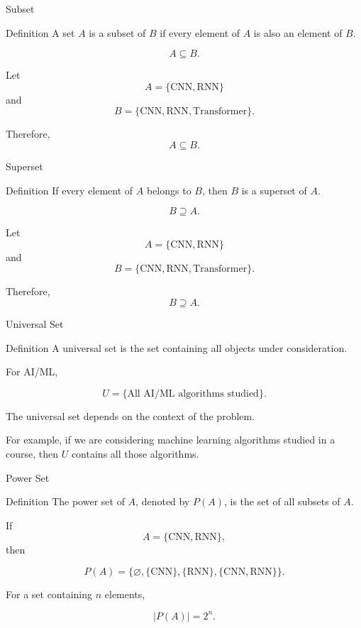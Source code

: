 \documentclass[aspectratio=169]{beamer}
\begin{document}
\begin{frame}{Subset}
\begin{block}{Definition}
A set $A$ is a subset of $B$ if every element of $A$ is also an element of $B$.
\end{block}

\[
A\subseteq B.
\]

Let
\[
A=\{\text{CNN},\text{RNN}\}
\]
and
\[
B=\{\text{CNN},\text{RNN},\text{Transformer}\}.
\]

Therefore,
\[
A\subseteq B.
\]
\end{frame}

\begin{frame}{Superset}
\begin{block}{Definition}
If every element of $A$ belongs to $B$, then $B$ is a superset of $A$.
\end{block}

\[
B\supseteq A.
\]

Let
\[
A=\{\text{CNN},\text{RNN}\}
\]
and
\[
B=\{\text{CNN},\text{RNN},\text{Transformer}\}.
\]

Therefore,
\[
B\supseteq A.
\]
\end{frame}

\begin{frame}{Universal Set}
\begin{block}{Definition}
A universal set is the set containing all objects under consideration.
\end{block}

For AI/ML,

\[
U=\{\text{All AI/ML algorithms studied}\}.
\]

The universal set depends on the context of the problem.

For example, if we are considering machine learning algorithms studied in a course, then $U$ contains all those algorithms.
\end{frame}

\begin{frame}{Power Set}
\begin{block}{Definition}
The power set of $A$, denoted by $P(A)$, is the set of all subsets of $A$.
\end{block}

If
\[
A=\{\text{CNN},\text{RNN}\},
\]
then

\[
P(A)=
\{\varnothing,
\{\text{CNN}\},
\{\text{RNN}\},
\{\text{CNN},\text{RNN}\}\}.
\]

For a set containing $n$ elements,

\[
|P(A)|=2^n.
\]
\end{frame}
\end{document}

